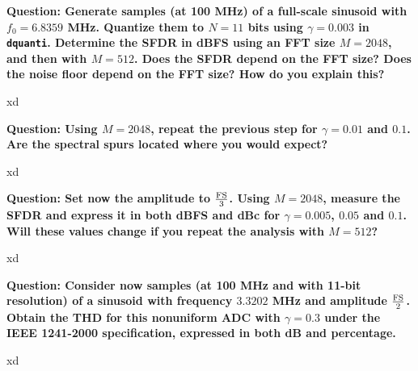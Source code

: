 \vspace{1cm}
\textbf{Question: Generate  samples (at 100 MHz) of a full-scale sinusoid with $f_0 = 6.8359$ MHz.
Quantize them to $N=11$ bits using $\gamma = 0.003$ in {\tt dquanti}. 
Determine the SFDR in dBFS using an FFT size $M=2048$, and then with $M=512$. 
Does the SFDR depend on the FFT size? Does the noise floor depend on the FFT size? How do you explain this?
}
\vspace{0.5cm}

xd

\vspace{1cm}
\textbf{Question: Using $M=2048$, repeat the previous step for $\gamma = 0.01$ and $0.1$. Are the spectral spurs located where you would expect?
}
\vspace{0.5cm}

xd

\vspace{1cm}
\textbf{Question: Set now the amplitude to $\frac{\rm FS}{3}$. Using $M=2048$, measure the SFDR and express it in both dBFS and dBc for $\gamma=0.005$, $0.05$ and $0.1$. Will these values change if you repeat the analysis with $M=512$?
}
\vspace{0.5cm}

xd

\vspace{1cm}
\textbf{Question: Consider now samples (at 100 MHz and with 11-bit resolution) of a sinusoid with frequency $3.3202$ MHz and amplitude $\frac{\rm FS}{2}$. Obtain the THD for this nonuniform ADC with $\gamma = 0.3$ under the IEEE 1241-2000 specification, expressed in both dB and percentage.
}
\vspace{0.5cm}

xd

